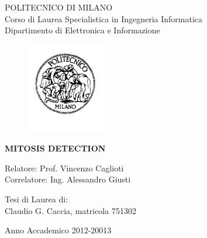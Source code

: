 \thispagestyle{empty}
\vspace*{-1.5cm}
\bfseries{
	\begin{center}
		\large
		POLITECNICO DI MILANO\\
		\normalsize
		Corso di Laurea Specialistica in Ingegneria Informatica\\
		Dipartimento di Elettronica e Informazione\\
		\begin{figure}[htbp]
			\begin{center}
				\includegraphics[width=3.5cm]{./images/logopm}
			\end{center}
		\end{figure}
		
		\vspace*{0.5cm} \LARGE
		
		\textbf{MITOSIS DETECTION}\\
		
		\vspace*{.75truecm} \large
		
	\end{center}
	
	\vspace*{3.0cm} \large
	
	\begin{flushleft}
		Relatore: Prof. Vincenzo Caglioti \\
		Correlatore: Ing. Alessandro Giusti
	\end{flushleft}
	
	\vspace*{1.5cm}
	
	\begin{flushright}
		Tesi di Laurea di:\\ Claudio G. Caccia, matricola 751302 \\
	\end{flushright}
	
	\vspace*{2.25cm}
	
	\begin{center}
		Anno Accademico 2012-20013
	\end{center} \clearpage
}
